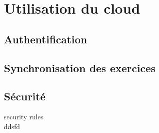 
\section{Utilisation du cloud}

\subsection{Authentification}

\subsection{Synchronisation des exercices}

\subsection{Sécurité}
security rules \\
ddsfd
